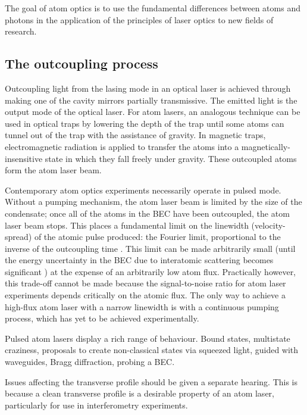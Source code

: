 The goal of atom optics is to use the fundamental differences between atoms and photons in the application of the principles of laser optics to new fields of research.

\subsection{The outcoupling process}

Outcoupling light from the lasing mode in an optical laser is achieved through making one of the cavity mirrors partially transmissive.  The emitted light is the output mode of the optical laser.  For atom lasers, an analogous technique can be used in optical traps by lowering the depth of the trap until some atoms can tunnel out of the trap with the assistance of gravity.  In magnetic traps, electromagnetic radiation is applied to transfer the atoms into a magnetically-insensitive state in which they fall freely under gravity.  These outcoupled atoms form the atom laser beam.

Contemporary atom optics experiments necessarily operate in pulsed mode.  Without a pumping mechanism, the atom laser beam is limited by the size of the condensate; once all of the atoms in the BEC have been outcoupled, the atom laser beam stops.  This places a fundamental limit on the linewidth (velocity-spread) of the atomic pulse produced: the Fourier limit, proportional to the inverse of the outcoupling time \citep{Johnsson:2007}.  This limit can be made arbitrarily small (until the energy uncertainty in the BEC due to interatomic scattering becomes significant \cite{Johnsson:2007a}) at the expense of an arbitrarily low atom flux.  Practically however, this trade-off cannot be made because the signal-to-noise ratio for atom laser experiments depends critically on the atomic flux.  The only way to achieve a high-flux atom laser with a narrow linewidth is with a continuous pumping process, which has yet to be achieved experimentally. 

Pulsed atom lasers display a rich range of behaviour.  Bound states, multistate craziness, proposals to create non-classical states via squeezed light, guided with waveguides, Bragg diffraction, probing a BEC.


Issues affecting the transverse profile should be given a separate hearing.  This is because a clean transverse profile is a desirable property of an atom laser, particularly for use in interferometry experiments.


